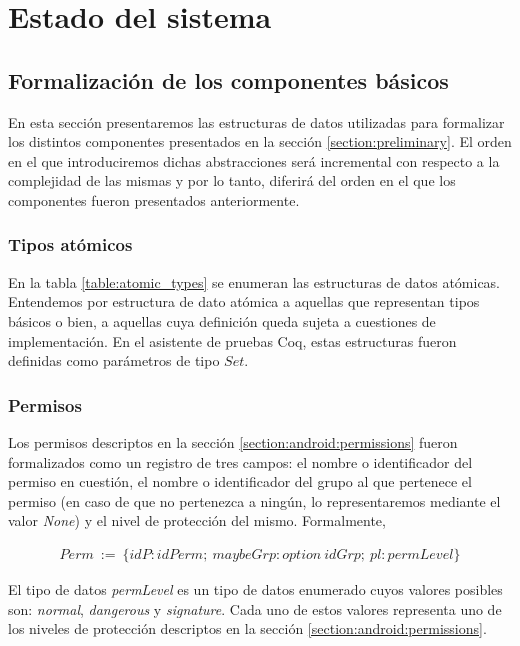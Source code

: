 \section{Estado del sistema}
\label{section:formalization:state}

\subsection{Formalización de los componentes básicos}
En esta sección presentaremos las estructuras de datos utilizadas para formalizar los distintos
componentes presentados en la sección \ref{section:preliminary}. El orden en el que introduciremos
dichas abstracciones será incremental con respecto a la complejidad de las mismas y por lo tanto,
diferirá del orden en el que los componentes fueron presentados anteriormente.

\subsubsection*{Tipos atómicos}
En la tabla \ref{table:atomic_types} se enumeran las estructuras de datos atómicas. Entendemos por
estructura de dato atómica a aquellas que representan tipos básicos o bien, a aquellas cuya definición
queda sujeta a cuestiones de implementación. En el asistente de pruebas Coq, estas estructuras fueron
definidas como parámetros de tipo $Set$.



\subsubsection*{Permisos}
Los permisos descriptos en la sección \ref{section:android:permissions} fueron formalizados como un
registro de tres campos: el nombre o identificador del permiso en cuestión, el nombre o identificador del
grupo al que pertenece el permiso (en caso de que no pertenezca a ningún, lo representaremos mediante el
valor \textit{None}) y el nivel de protección del mismo. Formalmente,

\begin{align*}
    Perm\ :=\ \{ idP: idPerm;\ maybeGrp: option\ idGrp;\ pl: permLevel \}
\end{align*}

El tipo de datos \textit{permLevel} es un tipo de datos enumerado cuyos valores posibles son:
\textit{normal}, \textit{dangerous} y \textit{signature}. Cada uno de estos valores representa uno de los
niveles de protección descriptos en la sección \ref{section:android:permissions}.

